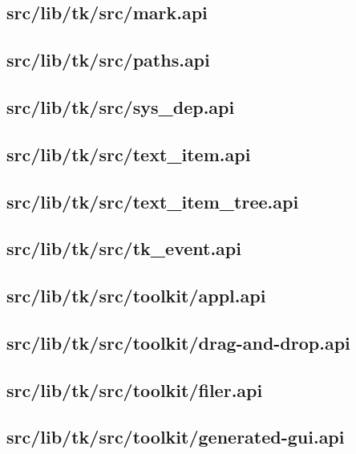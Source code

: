 \subsection{src/lib/tk/src/mark.api}


\subsection{src/lib/tk/src/paths.api}


\subsection{src/lib/tk/src/sys\_dep.api}


\subsection{src/lib/tk/src/text\_item.api}


\subsection{src/lib/tk/src/text\_item\_tree.api}


\subsection{src/lib/tk/src/tk\_event.api}


\subsection{src/lib/tk/src/toolkit/appl.api}


\subsection{src/lib/tk/src/toolkit/drag-and-drop.api}


\subsection{src/lib/tk/src/toolkit/filer.api}


\subsection{src/lib/tk/src/toolkit/generated-gui.api}


